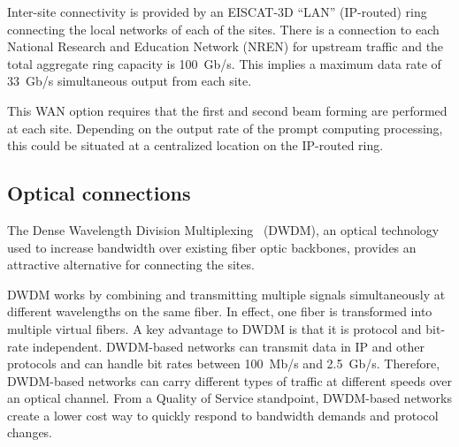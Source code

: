 \documentclass[12pt,a4paper]{article}
\begin{document}
Inter-site connectivity is provided by an EISCAT-3D ``LAN'' (IP-routed) ring connecting the local networks of each of the sites.
There is a connection to each National Research and Education Network (NREN) for upstream traffic and the total aggregate ring capacity is 100~Gb/s.
This implies a maximum data rate of 33~Gb/s simultaneous output from each site.

This WAN option requires that the first and second beam forming are performed at each site.
Depending on the output rate of the prompt computing processing, this could be situated at a centralized location on the IP-routed ring.

\subsection{Optical connections}
\label{ssec:optical}

The Dense Wavelength Division Multiplexing~\cite{dwdm} (DWDM), an optical technology used to increase bandwidth over existing fiber optic backbones, provides an attractive alternative for connecting the \ED sites.

DWDM works by combining and transmitting multiple signals simultaneously at different wavelengths on the same fiber. 
In effect, one fiber is transformed into multiple virtual fibers. 
A key advantage to DWDM is that it is protocol and bit-rate independent. 
DWDM-based networks can transmit data in IP and other protocols and can handle bit rates between 100~Mb/s and 2.5~Gb/s. 
Therefore, DWDM-based networks can carry different types of traffic at different speeds over an optical channel.
From a Quality of Service standpoint, DWDM-based networks create a lower cost way to quickly respond to bandwidth demands and protocol changes.
\end{document}
